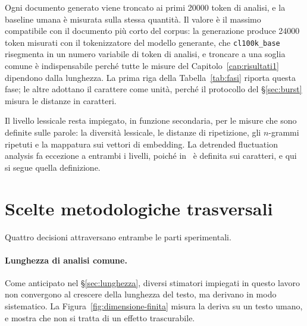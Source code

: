 Ogni documento generato viene troncato ai primi \num{20000} token di analisi, e
la baseline umana è misurata sulla stessa quantità. Il valore è il massimo
compatibile con il documento più corto del corpus: la generazione produce
\num{24000} token misurati con il tokenizzatore del modello generante, che
\texttt{cl100k\_base} risegmenta in un numero variabile di token di analisi, e
troncare a una soglia comune è indispensabile perché tutte le misure del
Capitolo~\ref{cap:risultati1} dipendono dalla lunghezza. La prima riga della
Tabella~\ref{tab:fasi} riporta questa fase; le altre adottano il carattere come
unità, perché il protocollo del §\ref{sec:burst} misura le distanze in
caratteri.

Il livello lessicale resta impiegato, in funzione secondaria, per le misure che
sono definite sulle parole: la diversità lessicale, le distanze di ripetizione,
gli $n$-grammi ripetuti e la mappatura sui vettori di embedding. La detrended
fluctuation analysis fa eccezione a entrambi i livelli, poiché
in~\cite{lippi2019} è definita sui caratteri, e qui si segue quella definizione.

\section{Scelte metodologiche trasversali}
\label{sec:scelte}

Quattro decisioni attraversano entrambe le parti sperimentali.

\paragraph{Lunghezza di analisi comune.}
Come anticipato nel §\ref{sec:lunghezza}, diversi stimatori impiegati in questo
lavoro non convergono al crescere della lunghezza del testo, ma derivano in modo
sistematico. La Figura~\ref{fig:dimensione-finita} misura la deriva su un testo
umano, e mostra che non si tratta di un effetto trascurabile.

